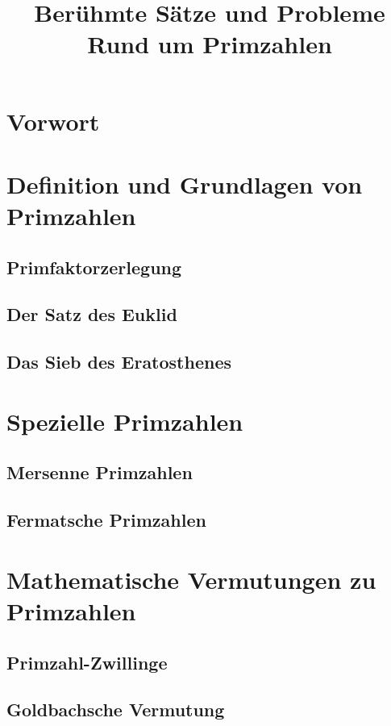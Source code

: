 \documentclass[11pt]{article}
\begin{document}
\title{Berühmte Sätze und Probleme Rund um Primzahlen}
\tableofcontents
\newpage
\section*{Vorwort}

\newpage
\section{Definition und Grundlagen von Primzahlen}

\subsection{Primfaktorzerlegung}

\subsection{Der Satz des Euklid}
\subsection{Das Sieb des Eratosthenes}
\section{Spezielle Primzahlen}
\subsection{Mersenne Primzahlen}
\subsection{Fermatsche Primzahlen}
\section{Mathematische Vermutungen zu Primzahlen}
\subsection{Primzahl-Zwillinge}
\subsection{Goldbachsche Vermutung}
\end{document}
